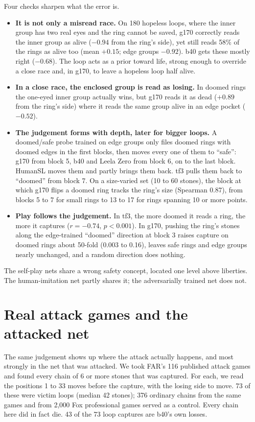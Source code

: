 \documentclass[11pt]{article}
\newcommand{\pos}[1]{$+#1$}
\newcommand{\nega}[1]{$-#1$}
\begin{document}
Four checks sharpen what the error is.
\begin{itemize}
\item \textbf{It is not only a misread race.} On 180 hopeless loops, where the inner group has two real eyes and the ring cannot be saved, g170 correctly reads the inner group as alive (\nega{0.94} from the ring's side), yet still reads 58\% of the rings as alive too (mean \pos{0.15}; edge groups \nega{0.92}). b40 gets these mostly right (\nega{0.68}). The loop acts as a prior toward life, strong enough to override a close race and, in g170, to leave a hopeless loop half alive.
\item \textbf{In a close race, the enclosed group is read as losing.} In doomed rings the one-eyed inner group actually wins, but g170 reads it as dead (\pos{0.89} from the ring's side) where it reads the same group alive in an edge pocket (\nega{0.52}).
\item \textbf{The judgement forms with depth, later for bigger loops.} A doomed/safe probe trained on edge groups only files doomed rings with doomed edges in the first blocks, then moves every one of them to ``safe'': g170 from block 5, b40 and Leela Zero from block 6, on to the last block. HumanSL moves them and partly brings them back. tf3 pulls them back to ``doomed'' from block 7. On a size-varied set (10 to 60 stones), the block at which g170 flips a doomed ring tracks the ring's size (Spearman 0.87), from blocks 5 to 7 for small rings to 13 to 17 for rings spanning 10 or more points.
\item \textbf{Play follows the judgement.} In tf3, the more doomed it reads a ring, the more it captures ($r = -0.74$, $p < 0.001$). In g170, pushing the ring's stones along the edge-trained ``doomed'' direction at block 3 raises capture on doomed rings about 50-fold (0.003 to 0.16), leaves safe rings and edge groups nearly unchanged, and a random direction does nothing.
\end{itemize}

The self-play nets share a wrong safety concept, located one level above liberties. The human-imitation net partly shares it; the adversarially trained net does not.

\section{Real attack games and the attacked net}
\label{sec:real}

The same judgement shows up where the attack actually happens, and most strongly in the net that was attacked. We took FAR's 116 published attack games and found every chain of 6 or more stones that was captured. For each, we read the positions 1 to 33 moves before the capture, with the losing side to move. 73 of these were victim loops (median 42 stones); 376 ordinary chains from the same games and from 2,000 Fox professional games served as a control. Every chain here did in fact die. 43 of the 73 loop captures are b40's own losses.
\end{document}
